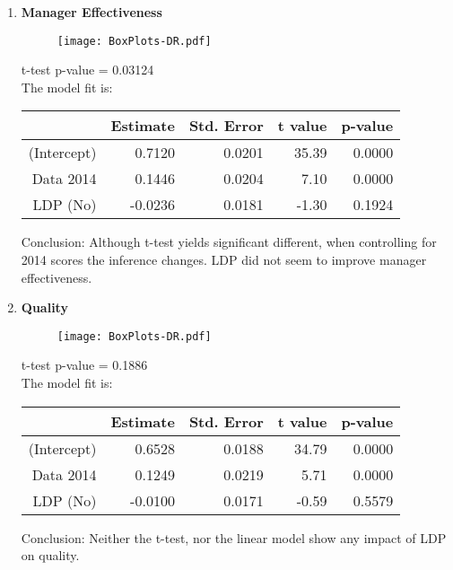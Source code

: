\documentclass[11pt]{extarticle} %
\begin{document}
\begin{enumerate}
\item {\bf{Manager Effectiveness}}\\
\begin{minipage}[t]{0.3\textwidth}
\begin{figure}[H]
\centering 
\texttt{[image: BoxPlots-DR.pdf]}
\end{figure}
\end{minipage}
\begin{minipage}[t]{0.6\textwidth}
\vspace{0.8cm}
t-test p-value = 0.03124 \\
The model fit is:
\begin{table}[H]
\centering
\begin{tabular}{rrrrr}
  \hline
 & Estimate & Std. Error & t value & p-value \\ 
  \hline
(Intercept) & 0.7120 & 0.0201 & 35.39 & 0.0000 \\ 
  Data 2014 & 0.1446 & 0.0204 & 7.10 & 0.0000 \\ 
  LDP (No) & -0.0236 & 0.0181 & -1.30 & 0.1924 \\ 
   \hline
\end{tabular}
\end{table}
Conclusion: Although t-test yields significant different, when controlling for 2014 scores the inference changes. LDP did not seem to improve manager effectiveness.
\end{minipage}

\item {\bf{Quality}}\\
\begin{minipage}[t]{0.3\textwidth}
\begin{figure}[H]
\centering 
\texttt{[image: BoxPlots-DR.pdf]}
\end{figure}
\end{minipage}
\begin{minipage}[t]{0.6\textwidth}
\vspace{0.8cm}
t-test p-value = 0.1886 \\
The model fit is:
\begin{table}[H]
\centering
\begin{tabular}{rrrrr}
  \hline
 & Estimate & Std. Error & t value & p-value \\ 
  \hline
(Intercept) & 0.6528 & 0.0188 & 34.79 & 0.0000 \\ 
  Data 2014 & 0.1249 & 0.0219 & 5.71 & 0.0000 \\ 
  LDP (No) & -0.0100 & 0.0171 & -0.59 & 0.5579 \\ 
   \hline
\end{tabular}
\end{table}
Conclusion: Neither the t-test, nor the linear model show any impact of LDP on quality. 
\end{minipage}


\end{enumerate}
\end{document}
